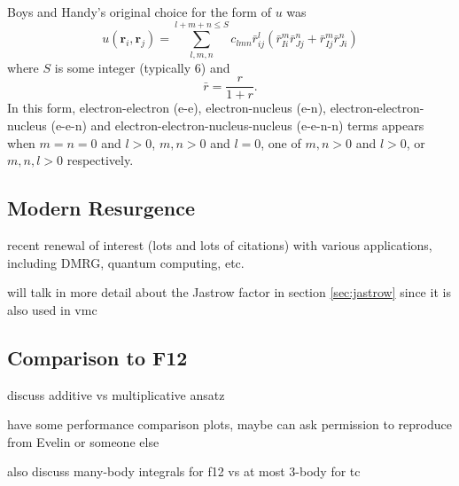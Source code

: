 Boys and Handy's original choice for the form of $u$ was
\begin{equation}
    u(\bm r_i, \bm r_j) = \sum_{l,m,n}^{l+m+n\leq S} c_{lmn}\bar r_{ij}^l(\bar r_{Ii}^m\bar r_{Jj}^n + \bar r_{Ij}^m\bar r_{Ji}^n)
\end{equation}
where $S$ is some integer (typically 6) and
\begin{equation}
    \bar r = \frac{r}{1+r}.
\end{equation}
In this form, electron-electron (e-e), electron-nucleus (e-n), electron-electron-nucleus (e-e-n) and electron-electron-nucleus-nucleus (e-e-n-n) terms appears when $m=n=0$ and $l>0$, $m,n>0$ and $l=0$, one of $m,n>0$ and $l>0$, or $m,n,l>0$ respectively.



\subsection{Modern Resurgence}


recent renewal of interest (lots and lots of citations) with various applications, including DMRG, quantum computing, etc.

will talk in more detail about the Jastrow factor in section \ref{sec:jastrow} since it is also used in vmc




\subsection{Comparison to F12}

discuss additive vs multiplicative ansatz

have some performance comparison plots, maybe can ask permission to reproduce from Evelin or someone else

also discuss many-body integrals for f12 vs at most 3-body for tc


